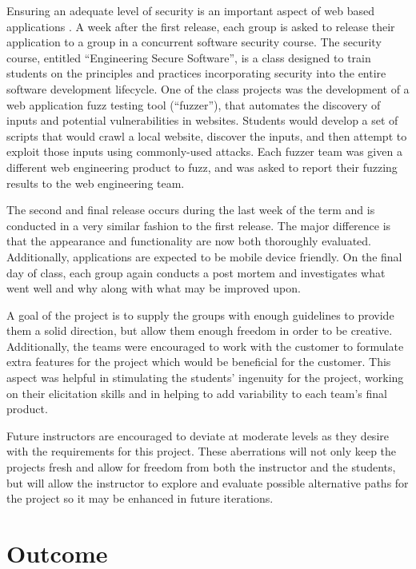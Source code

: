 \documentclass[conference]{IEEEtran}
\begin{document}
Ensuring an adequate level of security is an important aspect of web based applications \cite{Glisson:2006:WES:1145581.1145633}. A week after the first release, each group is asked to release their application to a group in a concurrent software security course. The security course, entitled “Engineering Secure Software”, is a class designed to train students on the principles and practices incorporating security into the entire software development lifecycle. One of the class projects was the development of a web application fuzz testing tool (“fuzzer”), that automates the discovery of inputs and potential vulnerabilities in websites. Students would develop a set of scripts that would crawl a local website, discover the inputs, and then attempt to exploit those inputs using commonly-used attacks. Each fuzzer team was given a different web engineering product to fuzz, and was asked to report their fuzzing results to the web engineering team.

The second and final release occurs during the last week of the term and is conducted in a very similar fashion to the first release. The major difference is that the appearance and functionality are now both thoroughly evaluated. Additionally, applications are expected to be mobile device friendly. On the final day of class, each group again conducts a post mortem and investigates what went well and why along with what may be improved upon.

A goal of the project is to supply the groups with enough guidelines to provide them a solid direction, but allow them enough freedom in order to be creative. Additionally, the teams were encouraged to work with the customer to formulate extra features for the project which would be beneficial for the customer. This aspect was helpful in stimulating the students’ ingenuity for the project, working on their elicitation skills and in helping to add variability to each team's final product.

Future instructors are encouraged to deviate at moderate levels as they desire with the requirements for this project. These aberrations will not only keep the projects fresh and allow for freedom from both the instructor and the students, but will allow the instructor to explore and evaluate possible alternative paths for the project so it may be enhanced in future iterations.

\section{Outcome}
\end{document}
